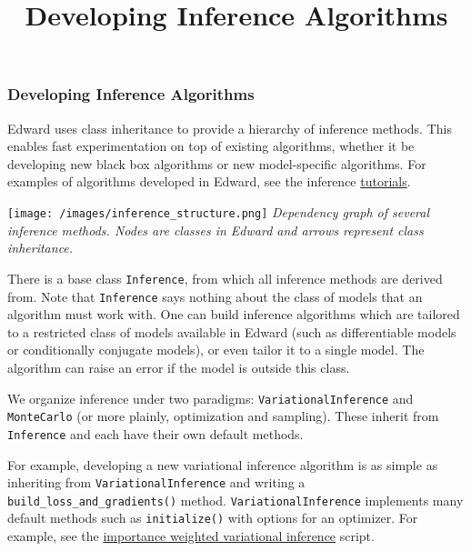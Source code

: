 \title{Developing Inference Algorithms}

\subsubsection{Developing Inference Algorithms}

Edward uses class inheritance to provide a hierarchy of inference
methods. This enables fast experimentation on top of existing
algorithms, whether it be developing new black box algorithms or
new model-specific algorithms.
For examples of algorithms developed in Edward, see the inference
\href{/tutorials/}{tutorials}.

\texttt{[image: /images/inference\_structure.png]}
{\small\textit{Dependency graph of several inference methods.
Nodes are classes in Edward and arrows represent class inheritance.}}

There is a base class \texttt{Inference}, from which all inference
methods are derived from. Note that \texttt{Inference} says nothing
about the class of models that an algorithm must work with. One can
build inference algorithms which are tailored to a restricted class of
models available in Edward (such as differentiable models or
conditionally conjugate models), or even tailor it to a single model.
The algorithm can raise an error if the model is outside this class.

We organize inference under two paradigms:
\texttt{VariationalInference} and \texttt{MonteCarlo} (or more plainly,
optimization and sampling). These inherit from \texttt{Inference} and each
have their own default methods.

For example, developing a new variational inference algorithm is as simple as
inheriting from \texttt{VariationalInference} and writing a
\texttt{build_loss_and_gradients()} method. \texttt{VariationalInference} implements many default methods such
as \texttt{initialize()} with options for an optimizer.
For example, see the
\href{https://github.com/blei-lab/edward/blob/master/examples/iwvi.py}{importance
weighted variational inference} script.
